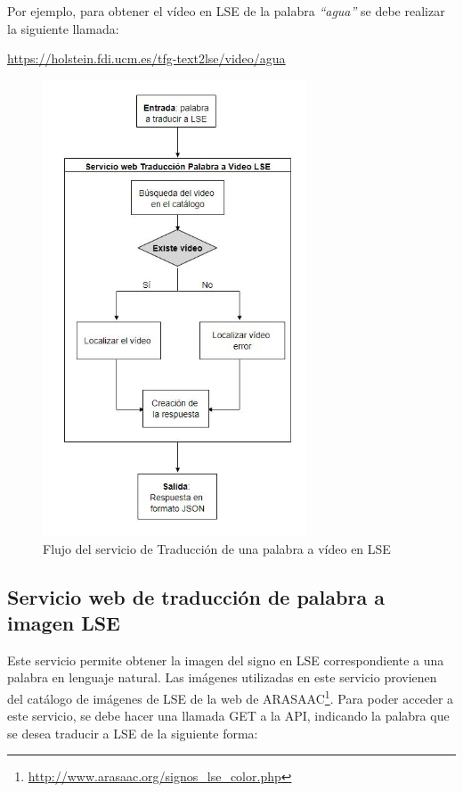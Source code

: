 Por ejemplo, para obtener el vídeo en LSE de la palabra \textit{``agua''} se debe realizar la siguiente llamada:

\begin{shaded}
	\url{https://holstein.fdi.ucm.es/tfg-text2lse/video/agua }	
\end{shaded}


\begin{figure}[]
	\centering
	\includegraphics[width=0.7\textwidth]{Imagenes/Fuentes/Text2LSE/FlujoVideo1palabra.jpg}
	\caption{Flujo del servicio de Traducción de una palabra a vídeo en LSE}
	\label {fig: imgFlujo1palabraText2LSE}
\end{figure}

\subsection{Servicio web de traducción de palabra a imagen LSE }

Este servicio permite obtener la imagen del signo en LSE correspondiente a una palabra en lenguaje natural. Las imágenes utilizadas en este servicio provienen del catálogo de imágenes de LSE de la web de ARASAAC\footnote{\url{http://www.arasaac.org/signos_lse_color.php}}. Para poder acceder a este servicio, se debe hacer una llamada GET a la API,  indicando la palabra que se desea traducir a LSE de la siguiente forma:\\

